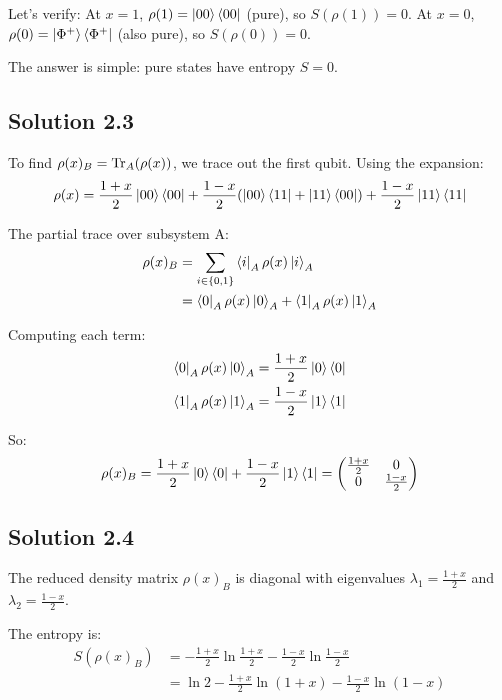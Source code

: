 \documentclass[11pt]{article}
\begin{document}
Let's verify: At $x=1$, $\rho(1) = \ket{00}\bra{00}$ (pure), so $S(\rho(1)) = 0$.
At $x=0$, $\rho(0) = \ket{\Phi^+}\bra{\Phi^+}$ (also pure), so $S(\rho(0)) = 0$.

The answer is simple: pure states have entropy $S = 0$.

\subsection{Solution 2.3}

To find $\rho(x)_B = \Tr_A(\rho(x))$, we trace out the first qubit. Using the expansion:
\begin{equation*}
    \rho(x) = \frac{1+x}{2}\ket{00}\bra{00} + \frac{1-x}{2}(\ket{00}\bra{11} + \ket{11}\bra{00}) + \frac{1-x}{2}\ket{11}\bra{11}
\end{equation*}

The partial trace over subsystem A:
\begin{align*}
    \rho(x)_B &= \sum_{i \in \{0,1\}} \bra{i}_A \rho(x) \ket{i}_A \\
    &= \bra{0}_A \rho(x) \ket{0}_A + \bra{1}_A \rho(x) \ket{1}_A
\end{align*}

Computing each term:
\begin{align*}
    \bra{0}_A \rho(x) \ket{0}_A &= \frac{1+x}{2}\ket{0}\bra{0} \\
    \bra{1}_A \rho(x) \ket{1}_A &= \frac{1-x}{2}\ket{1}\bra{1}
\end{align*}

So:
\begin{equation*}
    \rho(x)_B = \frac{1+x}{2}\ket{0}\bra{0} + \frac{1-x}{2}\ket{1}\bra{1} = \begin{pmatrix} \frac{1+x}{2} & 0 \\ 0 & \frac{1-x}{2} \end{pmatrix}
\end{equation*}

\subsection{Solution 2.4}

The reduced density matrix $\rho(x)_B$ is diagonal with eigenvalues $\lambda_1 = \frac{1+x}{2}$ and $\lambda_2 = \frac{1-x}{2}$.

The entropy is:
\begin{align*}
    S(\rho(x)_B) &= -\frac{1+x}{2}\ln\frac{1+x}{2} - \frac{1-x}{2}\ln\frac{1-x}{2} \\
    &= \ln 2 - \frac{1+x}{2}\ln(1+x) - \frac{1-x}{2}\ln(1-x)
\end{align*}
\end{document}
